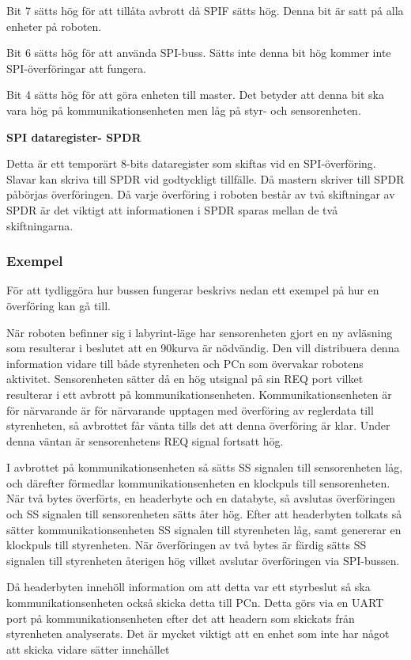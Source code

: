 Bit 7 sätts hög för att tillåta avbrott då SPIF sätts hög. Denna bit är satt 
på alla enheter på roboten.

Bit 6 sätts hög för att använda SPI-buss. Sätts inte denna bit hög kommer 
inte SPI-överföringar att fungera.

Bit 4 sätts hög för att göra enheten till master. Det betyder att denna bit 
ska vara hög på kommunikationsenheten men låg på styr- och sensorenheten.

\textbf{SPI dataregister- SPDR}


Detta är ett temporärt 8-bits dataregister som skiftas vid en SPI-överföring. 
Slavar kan skriva till SPDR vid godtyckligt tillfälle. Då mastern skriver 
till SPDR påbörjas överföringen. Då varje överföring i roboten består av två 
skiftningar av SPDR är det viktigt att informationen i SPDR sparas mellan de 
två skiftningarna.


\subsubsection{Exempel}

För att tydliggöra hur bussen fungerar beskrivs nedan ett exempel på hur en 
överföring kan gå till.

När roboten befinner sig i labyrint-läge har sensorenheten gjort en ny 
avläsning som resulterar i beslutet att en 90\degree kurva är nödvändig. Den 
vill distribuera denna information vidare till både styrenheten och PCn som 
övervakar robotens aktivitet. Sensorenheten sätter då en hög utsignal på sin 
REQ port vilket resulterar i ett avbrott på kommunikationsenheten. 
Kommunikationsenheten är för närvarande är för närvarande upptagen med 
överföring av reglerdata till styrenheten, så avbrottet får vänta tills det 
att denna överföring är klar. Under denna väntan är sensorenhetens REQ signal 
fortsatt hög.

I avbrottet på kommunikationsenheten så sätts SS signalen till sensorenheten 
låg, och därefter förmedlar kommunikationsenheten en klockpuls till 
sensorenheten. När två bytes överförts, en headerbyte och en databyte, så 
avslutas överföringen och SS signalen till sensorenheten sätts åter hög. 
Efter att headerbyten tolkats så sätter kommunikationsenheten SS signalen 
till styrenheten låg, samt genererar en klockpuls till styrenheten. När 
överföringen av två bytes är färdig sätts SS signalen till styrenheten 
återigen hög vilket avslutar överföringen via SPI-bussen. 

Då headerbyten innehöll information om att detta var ett styrbeslut så ska 
kommunikationsenheten också skicka detta till PCn. Detta görs via en UART 
port på kommunikationsenheten efter det att headern som skickats från 
styrenheten analyserats. Det är mycket viktigt att en enhet som inte har 
något att skicka vidare sätter innehållet 

